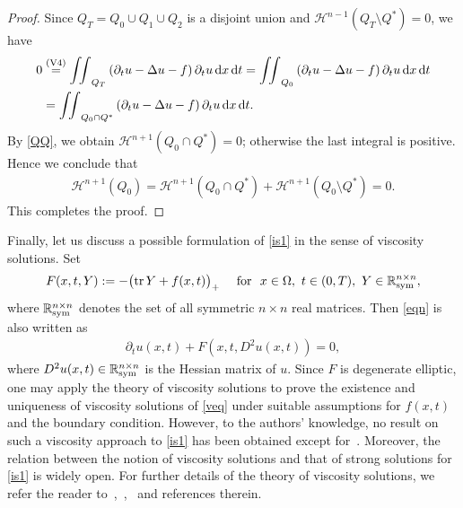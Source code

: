 \documentclass[reqno,10pt]{amsart}
\begin{document}
\begin{proof}
Since $Q_T=Q_0\cup Q_1\cup Q_2$ is a disjoint union and ${{\mathcal H}}^{n-1}(Q_T
 \setminus Q^*) = 0$, we have
\begin{align*}
0&\stackrel{\text{(V4)}}=
{\int\hspace{-1ex}\int}_{Q_T} \left( \partial_t u
-\Delta u-f\right)
\partial_t u
\,{\text{\rm d}} x \,{\text{\rm d}} t
=
{\int\hspace{-1ex}\int}_{Q_0}\left( \partial_t u
-\Delta u-f\right)
\partial_t u
\,{\text{\rm d}} x \,{\text{\rm d}} t\\
&=
{\int\hspace{-1ex}\int}_{Q_0\cap Q^*}\left(\partial_t u
-\Delta u-f\right)
\partial_t u 
\,{\text{\rm d}} x \,{\text{\rm d}} t.
\end{align*}
By \eqref{QQ}, we obtain ${{\mathcal H}}^{n+1}(Q_0\cap Q^*)=0$;
otherwise the last integral is positive.
Hence we conclude that
\begin{align*}
{{\mathcal H}}^{n+1}(Q_0)={{\mathcal H}}^{n+1}(Q_0\cap Q^*)+{{\mathcal H}}^{n+1}(Q_0\setminus Q^*)=0.
\end{align*}
This completes the proof. 
\end{proof}

Finally, let us discuss a possible formulation of
\eqref{is1} in the sense of viscosity solutions. Set 
\begin{equation}\label{veq}
F(x,t,Y):= - \big( \mathrm{tr} \, Y +f(x,t) \big)_+
\quad
\mbox{ for } \ x\in\Omega, \ t\in (0,T), \ Y \in {{\mathbb R}}^{n\times n}_{\rm sym},
\end{equation}
where ${{\mathbb R}}^{n\times n}_{\rm sym}$ denotes the set of all symmetric $n
\times n$ real matrices. Then \eqref{eqn} is also written as
\begin{align*}
\partial_t u(x,t) + F(x,t,D^2u(x,t)) = 0,
\end{align*}
where $D^2u(x,t)\in {{\mathbb R}}^{n\times n}_{\rm sym}$ is the Hessian matrix 
of $u$. Since $F$ is degenerate elliptic, one may apply the theory of
viscosity solutions to prove the existence and uniqueness of viscosity
solutions of \eqref{veq} under suitable assumptions for $f(x,t)$
and the boundary condition. However, to the authors' knowledge, no
result on such a viscosity approach to \eqref{is1} has been obtained except
for~\cite{YamaN}. Moreover, the relation between the notion of viscosity
solutions and that of strong solutions for \eqref{is1} is widely open.
For further details of the theory of viscosity solutions,
we refer the reader to~\cite{UG},~\cite{BG},~\cite{Gig06} and references
therein.
\end{document}
